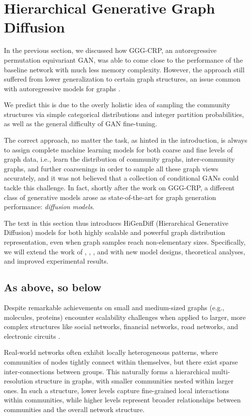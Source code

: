 \section{Hierarchical Generative Graph Diffusion}
\label{sec: higendiff}

In the previous section, we discussed how GGG-CRP, an autoregressive permutation equivariant GAN, was able to come close to the performance of the baseline network with much less memory complexity. However, the approach still suffered from lower generalization to certain graph structures, an issue common with autoregressive models for graphs \cite{krawczuk_gg-gan_2020}. 

We predict this is due to the overly holistic idea of sampling the community structures via simple categorical distributions and integer partition probabilities, as well as the general difficulty of GAN fine-tuning. 

The correct approach, no matter the task, as hinted in the introduction, is always to assign complete machine learning models for both coarse and fine levels of graph data, i.e., learn the distribution of community graphs, inter-community graphs, and further coarsenings in order to sample all these graph views accurately, and it was not believed that a collection of conditional GANs could tackle this challenge. In fact, shortly after the work on GGG-CRP, a different class of generative models arose as state-of-the-art for graph generation performance: \emph{diffusion models}. 

The text in this section thus introduces HiGenDiff (Hierarchical Generative Diffusion) models for both highly scalable and powerful graph distribution representation, even when graph samples reach non-elementary sizes. Specifically, we will extend the work of \cite{vignac_digress_2022}, \cite{karami_higen_2024}, \cite{karami_multi-resolution_2024}, and \cite{krawczuk_graph_2024} with new model designs, theoretical analyses, and improved experimental results.

\subsection{As above, so below}
Despite remarkable achievements on small and medium-sized graphs (e.g., molecules, proteins) encounter scalability challenges when applied to larger, more complex structures like social networks, financial networks, road networks, and electronic circuits \cite{krawczuk_graph_2024}. 

Real-world networks often exhibit locally heterogeneous patterns, where communities of nodes tightly connect within themselves, but there exist sparse inter-connections between groups.
This naturally forms a hierarchical multi-resolution structure in graphs, with smaller communities nested within larger ones. In such a structure, lower levels capture fine-grained local interactions within communities, while higher levels represent broader relationships between communities and
the overall network structure. 

